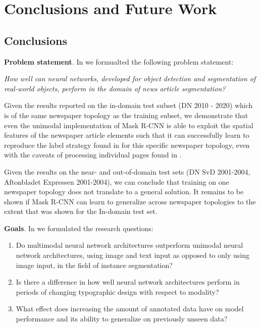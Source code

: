 \documentclass[oneside, english, bibtex]{kththesis}
\begin{document}
\chapter{Conclusions and Future Work}
\label{ch:conc}
\section{Conclusions}

\textbf{Problem statement}. In  we formualted the following problem statement:

\textit{How well can neural networks, developed for object detection and segmentation of real-world objects, perform in the domain of news article segmentation?}

Given the results reported on the in-domain test subset (DN 2010 - 2020) which is of the same newspaper topology as the training subset, we demonstrate that even the unimodal implementation of Mask R-CNN is able to exploit the spatial features of the newspaper article elements such that it can successfully learn to reproduce the label strategy found in  for this specific newspaper topology, even with the caveats of processing individual pages found in .

Given the results on the near- and out-of-domain test sets (DN SvD 2001-2004, Aftonbladet Expressen 2001-2004), we can conclude that training on one newspaper topology does not translate to a general solution. It remains to be shown if Mask R-CNN can learn to generalize across newspaper topologies to the extent that was shown for the In-domain test set.


\textbf{Goals}. In  we formulated the research questions:

\begin{enumerate}
\item Do multimodal neural network architectures outperform unimodal neural network architectures, using image and text input as opposed to only using image input, in the field of instance segmentation?
\item Is there a difference in how well neural network architectures perform in periods of changing typographic design with respect to modality?
\item What effect does increasing the amount of annotated data have on model performance and its ability to generalize on previously unseen data?
\end{enumerate}
\end{document}
